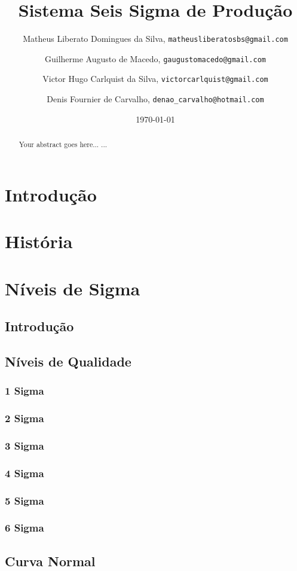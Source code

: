 \documentclass{abnt}
\author{
	Matheus Liberato Domingues da Silva, \texttt{matheusliberatosbs@gmail.com} \and
	Guilherme Augusto de Macedo, \texttt{gaugustomacedo@gmail.com} \and
	Victor Hugo Carlquist da Silva, \texttt{victorcarlquist@gmail.com} \and
	Denis Fournier de Carvalho, \texttt{denao\_carvalho@hotmail.com} 
}
\title{ Sistema Seis Sigma de Produção}
\date{\today}
\begin{document}
	\maketitle
	\tableofcontents

	\begin{abstract}
		Your abstract goes here...
		...
	\end{abstract}
	
	\chapter {Introdução}
	
	\chapter {História}
	
	\chapter {Níveis de Sigma}
		\section {Introdução}
		\section {Níveis de Qualidade}
			\subsection {1 Sigma}
			\subsection {2 Sigma}
			\subsection {3 Sigma}
			\subsection {4 Sigma}
			\subsection {5 Sigma}
			\subsection {6 Sigma}
		\section {Curva Normal}	
\end{document}
